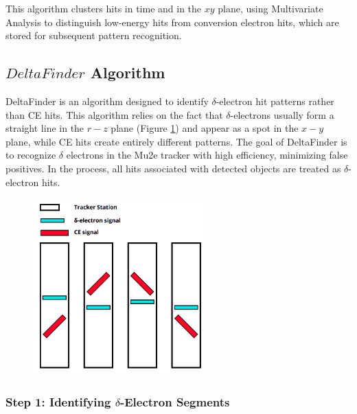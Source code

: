 This algorithm 
clusters hits in time and in the $xy$ plane, using 
Multivariate Analysis to distinguish low-energy 
hits from conversion electron hits, which are 
stored for subsequent pattern recognition.
\subsection{$DeltaFinder$ Algorithm}
DeltaFinder is an algorithm designed to identify $\delta$-electron hit patterns 
rather than CE hits. This algorithm relies on the fact that $\delta$-electrons usually 
form a straight line in the $r-z$ plane (Figure \ref{fig:yzviewdelta}) and appear as a spot in the $x-y$ plane, 
while CE hits create entirely different patterns. The goal of DeltaFinder is to recognize 
$\delta$ electrons in the Mu2e tracker with high efficiency, minimizing false positives. 
In the process, all hits associated with detected objects are treated as $\delta$-electron hits.
\begin{figure}[!h]
    \centering
    \includegraphics[width =0.6\textwidth]{figures/png/Screenshot_20240811_123048.png}
    \caption[$\delta$-electrons $y-z$ plane pattern.]{    }
    \label{fig:yzviewdelta}
\end{figure}
\subsubsection{Step 1: Identifying $\delta$-Electron Segments}

